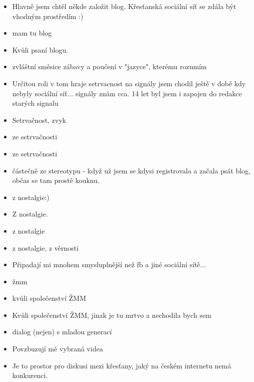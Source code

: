 \documentclass[12pt, a4paper, twoside]{article}
\begin{document}
\begin{itemize}
\item Hlavně jsem chtěl někde založit blog. Křesťanská sociální síť se zdála být vhodným prostředím :)

\item mam tu blog

\item Kvůli psaní blogu.

\item zvláštní směsice zábavy  a poučení v "jazyce", kterému rozumím

\item Určitou roli v tom hraje setrvacnost na signály jsem chodil ještě v době kdy nebyly sociální síť... signály znám cca. 14 let byl jsem i zapojen do redakce starých signalu

\item Setrvačnost, zvyk

\item ze setrvačnosti

\item ze setrvačnosti

\item částečně ze stereotypu - když už jsem se kdysi registrovala a začala psát blog, občas se tam prostě kouknu.

\item z nostalgie:)

\item Z nostalgie.

\item z nostalgie

\item z nostalgie, z věrnosti

\item Připadají mi mnohem smysluplnější než fb a jiné sociální sítě...

\item žmm

\item kvůli společenství ŽMM

\item Kvůli společenství ŽMM, jinak je tu mrtvo a nechodila bych sem

\item dialog (nejen) s mladou generací

\item Povzbuzují mě vybraná videa

\item Je to prostor pro diskusi mezi křesťany, jaký na českém internetu nemá konkurenci.


\end{itemize}
\end{document}
